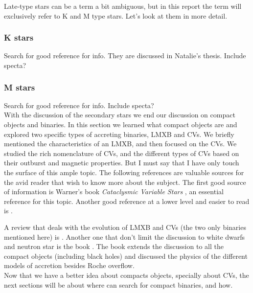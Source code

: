 Late-type stars can be a term a bit ambiguous, but in this report the term will exclusively refer to K and M type stars. Let's look at them in more detail.  

\subsubsection{K stars}

Search for good reference for info. They are discussed in Natalie's thesis. Include specta?


\subsubsection{M stars}

Search for good reference for info. Include specta? \\



With the discussion of the secondary stars we end our discussion on compact objects and binaries. In this section we learned what compact objects are and explored two specific types of accreting binaries, LMXB and CVs. We briefly mentioned the characteristics of an LMXB, and then focused on the CVs. We studied the rich nomenclature of CVs, and the different types of CVs based on their outburst and magnetic properties. But I must say that I have only touch the surface of this ample topic. The following references are valuable sources for the avid reader that wish to know more about the subject. The first good source of information is Warner's book \emph{Cataclysmic Variable Stars} \citep{warner_cataclysmic_2003}, an essential reference for this topic. Another good reference at a lower level and easier to read is \cite{hellier_cataclysmic_2001}. 

A review that deals with the evolution of LMXB and CVs (the two only binaries mentioned here) is \cite{patterson_evolution_1984}. Another one that don't limit the discussion to white dwarfs and neutron star is the book \cite{frank_accretion_2002}. The book extends the discussion to all the compact objects (including black holes) and discussed the physics of the different models of accretion besides Roche overflow. \\ 

Now that we have a better idea about compacts objects, specially about CVs, the next sections will be about where can search for compact binaries, and how. \\ 

